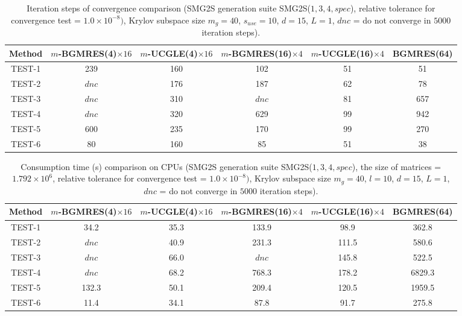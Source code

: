 \begin{table}[htbp]
	\scriptsize
\caption{Iteration steps of convergence comparison (SMG2S generation suite SMG2S($1,3,4, spec$), relative tolerance for convergence test = $1.0\times10^{-8})$, Krylov subspace size $m_g = 40$, $s_{use} = 10$, $d=15$, $L = 1$, $dnc$ = do not converge in $5000$ iteration steps).}
\centering
\renewcommand{\arraystretch}{1.6}
\begin{tabular}{c*{5}{c}}
	\toprule
	Method          & $m$-BGMRES(4)$\times 16$  & $m$-UCGLE(4)$\times 16$   &  $m$-BGMRES(16)$\times 4$ &  $m$-UCGLE(16)$\times 4$ &  BGMRES(64) \\
	\hline
	TEST-1 & \cellcolor{blue!20}239 & 160 & 102 & \cellcolor{red!20}51 & \cellcolor{red!20}51\\
	TEST-2  &\cellcolor{blue!20}$dnc$  & 176 & 187 & \cellcolor{red!20}62 & 78 \\
	TEST-3     & \cellcolor{blue!20}$dnc$  & 310 & \cellcolor{blue!20}$dnc$  & \cellcolor{red!20}81 &657 \\
	TEST-4    & \cellcolor{blue!20}$dnc$  & 320 & 629 & \cellcolor{red!20}99 & 942\\
	TEST-5     &\cellcolor{blue!20} 600 & 235 & 170 &\cellcolor{red!20} 99 & 270 \\
	TEST-6    & 80 & \cellcolor{blue!20}160 & 85 & 51 & \cellcolor{red!20}38 \\
	\hline
\end{tabular}
	\label{steps}
\end{table}

\begin{table}[htbp]
		\scriptsize
	\caption{Consumption time (s) comparison on CPUs (SMG2S generation suite SMG2S($1,3,4, spec$), the size of matrices = $1.792 \times 10^6$, relative tolerance for convergence test = $1.0\times10^{-8})$, Krylov subspace size $m_g = 40$, $l = 10$, $d=15$, $L = 1$, $dnc$ = do not converge in $5000$ iteration steps).}
\centering
\renewcommand{\arraystretch}{1.6}
\begin{tabular}{c*{5}{c}}
	\toprule
	Method          & $m$-BGMRES(4)$\times 16$  & $m$-UCGLE(4)$\times 16$   &  $m$-BGMRES(16)$\times 4$ &  $m$-UCGLE(16)$\times 4$ &  BGMRES(64) \\
	\hline
	TEST-1 & \cellcolor{red!20}34.2&	35.3	&133.9	&98.9	&\cellcolor{blue!20}362.8\\
	TEST-2     & $dnc$  & \cellcolor{red!20}40.9	&231.3	&111.5	&\cellcolor{blue!20}580.6\\
	TEST-3     & $dnc$  & \cellcolor{red!20}66.0 & $dnc$  & 145.8 & \cellcolor{blue!20}522.5 \\
	TEST-4     & $dnc$  & \cellcolor{red!20}68.2 & 768.3 & 178.2 & \cellcolor{blue!20}6829.3\\
	TEST-5   & 132.3 & \cellcolor{red!20}50.1 & 209.4 & 120.5 & \cellcolor{blue!20}1959.5 \\
	TEST-6   & \cellcolor{red!20}11.4 & 34.1 & 87.8 & 91.7 & \cellcolor{blue!20}275.8\\
	\hline
\end{tabular}
\label{timess}
\end{table}

